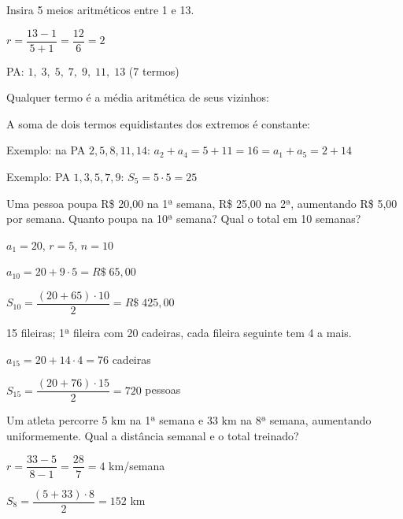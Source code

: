 \documentclass[12pt]{article}
\begin{document}
\begin{multicols}{2}
Insira 5 meios aritméticos entre 1 e 13.

$r = \dfrac{13 - 1}{5 + 1} = \dfrac{12}{6} = 2$

PA: $\boxed{1,\; 3,\; 5,\; 7,\; 9,\; 11,\; 13}$ \quad (7 termos)



Qualquer termo é a média aritmética de seus vizinhos:



A soma de dois termos equidistantes dos extremos é constante:


Exemplo: na PA $2, 5, 8, 11, 14$:
$a_2 + a_4 = 5 + 11 = 16 = a_1 + a_5 = 2 + 14$ \checkmark



Exemplo: PA $1, 3, 5, 7, 9$: $S_5 = 5 \cdot 5 = 25$ \checkmark



Uma pessoa poupa R\$ 20,00 na 1ª semana, R\$ 25,00 na 2ª, aumentando R\$ 5,00
por semana. Quanto poupa na 10ª semana? Qual o total em 10 semanas?

$a_1 = 20$, $r = 5$, $n = 10$

$a_{10} = 20 + 9 \cdot 5 = \boxed{R\$\; 65{,}00}$

$S_{10} = \dfrac{(20+65) \cdot 10}{2} = \boxed{R\$\; 425{,}00}$


15 fileiras; 1ª fileira com 20 cadeiras, cada fileira seguinte tem 4 a mais.

$a_{15} = 20 + 14 \cdot 4 = \boxed{76}$ cadeiras

$S_{15} = \dfrac{(20+76) \cdot 15}{2} = \boxed{720}$ pessoas


Um atleta percorre 5 km na 1ª semana e 33 km na 8ª semana, aumentando
uniformemente. Qual a distância semanal e o total treinado?

$r = \dfrac{33-5}{8-1} = \dfrac{28}{7} = \boxed{4}$ km/semana

$S_8 = \dfrac{(5+33) \cdot 8}{2} = \boxed{152}$ km

\end{multicols}


\end{document}
